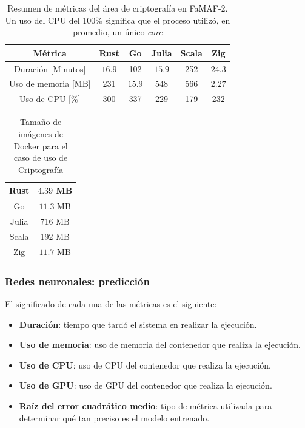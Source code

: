 \documentclass[11pt]{article}
\let\Oldsubsubsection\subsubsection
\renewcommand{\subsubsection}{\FloatBarrier\Oldsubsubsection}
\newcommand{\english}[1]{\textit{#1}}
\begin{document}
\begin{table}[H]
\centering
\begin{tabular}{|c|c|c|c|c|c|}
\hline
Métrica & Rust & Go & Julia & Scala & Zig \\ \hline
Duración [Minutos] & $16.9$ & 102 & $15.9$ & 252 & $24.3$ \\ \hline
Uso de memoria [MB] & 231 & $15.9$ & 548 & 566 & $2.27$ \\ \hline
Uso de CPU [\%] & 300 & 337 & 229 & 179 & 232 \\ \hline
\end{tabular}
\caption{Resumen de métricas del área de criptografía en FaMAF-2. Un uso del CPU del 100\% significa que el proceso utilizó, en promedio, un único \english{core}}
\label{tab:aes:famaf_2}
\end{table}

\begin{table}[H]
\centering
\begin{tabular}{|c|c|}
\hline
Rust & $4.39$ MB \\ \hline
Go & $11.3$ MB \\ \hline
Julia & 716 MB \\ \hline
Scala & 192 MB \\ \hline
Zig & $11.7$ MB \\ \hline
\end{tabular}
\caption{Tamaño de imágenes de Docker para el caso de uso de Criptografía}
\label{tab:aes:container_metrics}
\end{table}

\subsubsection{Redes neuronales: predicción} \label{sec:anex:metrics:nn}

El significado de cada una de las métricas es el siguiente:

\begin{itemize}
    \item \textbf{Duración}: tiempo que tardó el sistema en realizar la ejecución.
    \item \textbf{Uso de memoria}: uso de memoria del contenedor que realiza la ejecución.
    \item \textbf{Uso de CPU}: uso de CPU del contenedor que realiza la ejecución.
    \item \textbf{Uso de GPU}: uso de GPU del contenedor que realiza la ejecución.
    \item \textbf{Raíz del error cuadrático medio}: tipo de métrica utilizada para determinar qué tan preciso es el modelo entrenado.
\end{itemize}
\end{document}

